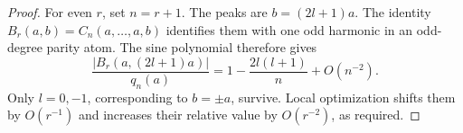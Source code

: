 \begin{proof}
For even $r$, set $n=r+1$. The peaks are $b=(2l+1)a$.
The identity $B_r(a,b)=C_n(a,\ldots,a,b)$ identifies them with
one odd harmonic in an odd-degree parity atom. The sine polynomial
therefore gives
\begin{equation}\label{eq:even-bias-peak-loss}
 \frac{|B_r(a,(2l+1)a)|}{q_n(a)}
       =1-\frac{2l(l+1)}n+O(n^{-2}).
\end{equation}
Only $l=0,-1$, corresponding to $b=\pm a$, survive.
Local optimization shifts them by $O(r^{-1})$ and increases their
relative value by $O(r^{-2})$, as required.
\end{proof}
